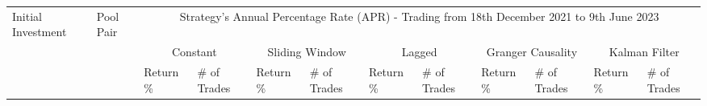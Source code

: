 \begin{table}[htb!]
    \centering
    \begin{adjustwidth}{-0.9in}{-0.9in}
        \begin{tabular}{|p{5em}|p{2em}|p{3em}|p{3em}|p{3em}|p{3em}|p{3em}|p{3em}|p{3em}|p{3em}|p{3em}|p{3em}|}\hline
            Initial Investment & Pool Pair & \multicolumn{10}{|c|}{Strategy's Annual Percentage Rate (APR) - Trading from 18th December 2021 to 9th June 2023} \\\cline{3-12}
            &   & \multicolumn{2}{|c|}{Constant} & \multicolumn{2}{|c|}{Sliding Window} & \multicolumn{2}{|c|}{Lagged} & \multicolumn{2}{|c|}{Granger Causality} & \multicolumn{2}{|c|}{Kalman Filter}\\\cline{3-12}
            & & Return \% & \# of Trades & Return \% & \# of Trades & Return \% & \# of Trades & Return \% & \# of Trades & Return \% & \# of Trades\\\hline


\end{tabular}
\end{adjustwidth}
\end{table}
